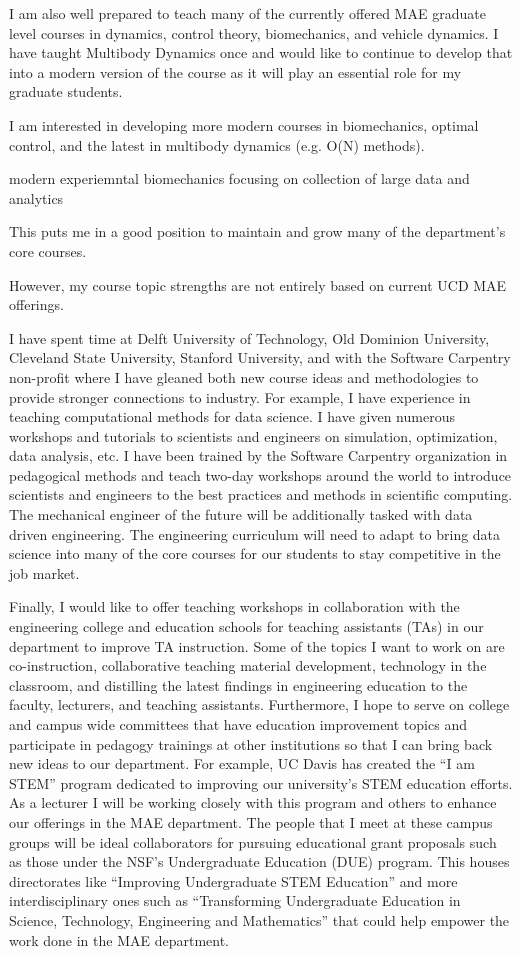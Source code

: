 \documentclass{article}
\begin{document}
I am also well prepared to teach many of the currently offered MAE graduate
level courses in dynamics, control theory, biomechanics, and vehicle dynamics.
I have taught Multibody Dynamics once and would like to continue to develop
that into a modern version of the course as it will play an essential role for
my graduate students.

I am interested in developing more modern courses in biomechanics, optimal
control, and the latest in multibody dynamics (e.g. O(N) methods).

modern experiemntal biomechanics focusing on collection of large data and
analytics

This puts me in a good position to maintain and grow many of the department's
core courses.

However, my course topic strengths are not entirely based on
current UCD MAE offerings.

I have spent time at Delft University of Technology, Old Dominion University,
Cleveland State University, Stanford University, and with the Software
Carpentry non-profit where I have gleaned both new course ideas and
methodologies to provide stronger connections to industry. For example, I have
experience in teaching computational methods for data science. I have given
numerous workshops and tutorials to scientists and engineers on simulation,
optimization, data analysis, etc. I have been trained by the Software Carpentry
organization in pedagogical methods and teach two-day workshops around the
world to introduce scientists and engineers to the best practices and methods
in scientific computing. The mechanical engineer of the future will be
additionally tasked with data driven engineering. The engineering curriculum
will need to adapt to bring data science into many of the core courses for our
students to stay competitive in the job market.

Finally, I would like to offer teaching workshops in collaboration with the
engineering college and education schools for teaching assistants (TAs) in our
department to improve TA instruction. Some of the topics I want to work on are
co-instruction, collaborative teaching material development, technology in the
classroom, and distilling the latest findings in engineering education to the
faculty, lecturers, and teaching assistants. Furthermore, I hope to serve on
college and campus wide committees that have education improvement topics and
participate in pedagogy trainings at other institutions so that I can bring
back new ideas to our department. For example, UC Davis has created the ``I am
STEM'' program dedicated to improving our university's STEM education efforts.
As a lecturer I will be working closely with this program and others to enhance
our offerings in the MAE department. The people that I meet at these campus
groups will be ideal collaborators for pursuing educational grant proposals
such as those under the NSF's Undergraduate Education (DUE) program. This
houses directorates like ``Improving Undergraduate STEM Education'' and more
interdisciplinary ones such as ``Transforming Undergraduate Education in
Science, Technology, Engineering and Mathematics'' that could help empower the
work done in the MAE department.
\end{document}
